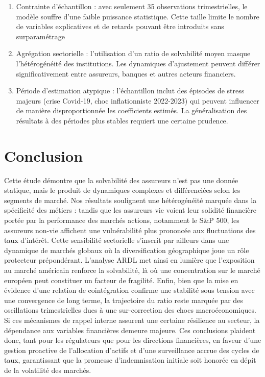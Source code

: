 \documentclass[
]{article}
\begin{document}
\begin{enumerate}
\def\labelenumi{\arabic{enumi}.}
\item
  Contrainte d'échantillon : avec seulement 35 observations
  trimestrielles, le modèle souffre d'une faible puissance statistique.
  Cette taille limite le nombre de variables explicatives et de retards
  pouvant être introduits sans surparamétrage
\item
  Agrégation sectorielle : l'utilisation d'un ratio de solvabilité moyen
  masque l'hétérogénéité des institutions. Les dynamiques d'ajustement
  peuvent différer significativement entre assureurs, banques et autres
  acteurs financiers.
\item
  Période d'estimation atypique : l'échantillon inclut des épisodes de
  stress majeurs (crise Covid-19, choc inflationniste 2022-2023) qui
  peuvent influencer de manière disproportionnée les coefficients
  estimés. La généralisation des résultats à des périodes plus stables
  requiert une certaine prudence.
\end{enumerate}

\section{Conclusion}\label{conclusion}

Cette étude démontre que la solvabilité des assureurs n'est pas une
donnée statique, mais le produit de dynamiques complexes et
différenciées selon les segments de marché. Nos résultats soulignent une
hétérogénéité marquée dans la spécificité des métiers : tandis que les
assureurs vie voient leur solidité financière portée par la performance
des marchés actions, notamment le S\&P 500, les assureurs non-vie
affichent une vulnérabilité plus prononcée aux fluctuations des taux
d'intérêt. Cette sensibilité sectorielle s'inscrit par ailleurs dans une
dynamique de marchés globaux où la diversification géographique joue un
rôle protecteur prépondérant. L'analyse ARDL met ainsi en lumière que
l'exposition au marché américain renforce la solvabilité, là où une
concentration sur le marché européen peut constituer un facteur de
fragilité. Enfin, bien que la mise en évidence d'une relation de
cointégration confirme une stabilité sous tension avec une convergence
de long terme, la trajectoire du ratio reste marquée par des
oscillations trimestrielles dues à une sur-correction des chocs
macroéconomiques. Si ces mécanismes de rappel interne assurent une
certaine résilience au secteur, la dépendance aux variables financières
demeure majeure. Ces conclusions plaident donc, tant pour les
régulateurs que pour les directions financières, en faveur d'une gestion
proactive de l'allocation d'actifs et d'une surveillance accrue des
cycles de taux, garantissant que la promesse d'indemnisation initiale
soit honorée en dépit de la volatilité des marchés.
\end{document}

